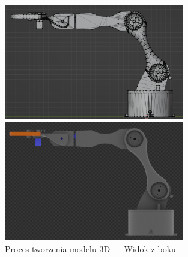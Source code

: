 \documentclass[11pt,titlepage]{article}
\begin{document}
\begin{figure}[h!]
    \begin{center}
        \includegraphics[width=0.7\textwidth]{img/leftW.png}
    \end{center}
    \begin{center}
        \includegraphics[width=0.7\textwidth]{img/leftC.png}
    \end{center}
    \caption{Proces tworzenia modelu 3D — Widok z boku}
    \label{Modelowanie3Dleft}
\end{figure}
\end{document}

